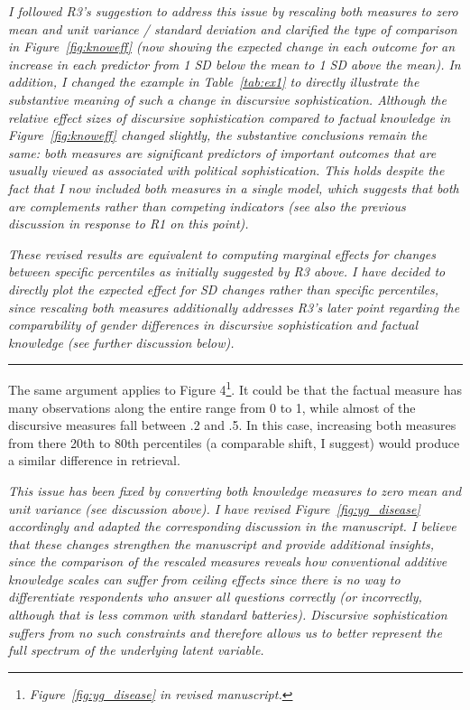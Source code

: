 \textit{I followed R3's suggestion to address this issue by rescaling both measures to zero mean and unit variance / standard deviation and clarified the type of comparison in Figure~\ref{fig:knoweff} (now showing the expected change in each outcome for an increase in each predictor from 1 SD below the mean to 1 SD above the mean). In addition, I changed the example in Table~\ref{tab:ex1} to directly illustrate the substantive meaning of such a change in discursive sophistication. Although the relative effect sizes of discursive sophistication compared to factual knowledge in Figure~\ref{fig:knoweff} changed slightly, the substantive conclusions remain the same: both measures are significant predictors of important outcomes that are usually viewed as associated with political sophistication. This holds despite the fact that I now included both measures in a single model, which suggests that both are complements rather than competing indicators (see also the previous discussion in response to R1 on this point).}

\textit{These revised results are equivalent to computing marginal effects for changes between specific percentiles as initially suggested by R3 above. I have decided to directly plot the expected effect for SD changes rather than specific percentiles, since rescaling both measures additionally addresses R3's later point regarding the comparability of gender differences in discursive sophistication and factual knowledge (see further discussion below).}


\rule{\linewidth}{.01cm}

The same argument applies to Figure 4\footnote{\textit{Figure~\ref{fig:yg_disease} in revised manuscript.}}. It could be that the factual measure has many observations along the entire range from 0 to 1, while almost of the discursive measures fall between .2 and .5. In this case, increasing both measures from there 20th to 80th percentiles (a comparable shift, I suggest) would produce a similar difference in retrieval.

\textit{This issue has been fixed by converting both knowledge measures to zero mean and unit variance (see discussion above). I have revised Figure~\ref{fig:yg_disease} accordingly and adapted the corresponding discussion in the manuscript. I believe that these changes strengthen the manuscript and provide additional insights, since the comparison of the rescaled measures reveals how conventional additive knowledge scales can suffer from ceiling effects since there is no way to differentiate respondents who answer all questions correctly (or incorrectly, although that is less common with standard batteries). Discursive sophistication suffers from no such constraints and therefore allows us to better represent the full spectrum of the underlying latent variable.}

